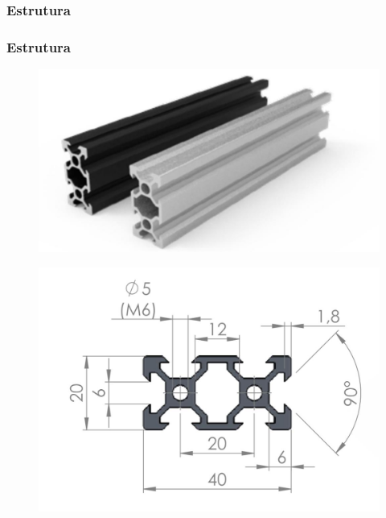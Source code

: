 \subsubsection{Estrutura}

\begin{frame}
\frametitle{Estrutura}

\begin{figure}
\centering
\includegraphics[scale = 0.15]{figs/p20x40p}
\end{figure}

\begin{figure}
\centering
\includegraphics[scale = 0.15]{figs/p20x40d.jpeg}
\end{figure}
    
\end{frame}
    
